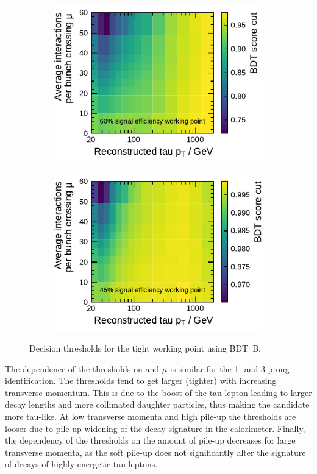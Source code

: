 \begin{figure}[htb]
  \centering
  \begin{subfigure}[t]{0.48\textwidth}
    \centering
    \includegraphics{./figures/bdt_perf/working_points/grid_1p_subsampling0269_wp.pdf}
  \end{subfigure}\hfill
  \begin{subfigure}[t]{0.48\textwidth}
    \centering
    \includegraphics{./figures/bdt_perf/working_points/grid_3p0327_wp.pdf}
  \end{subfigure}
  \caption{Decision thresholds for the tight working point using \mbox{BDT B}.}
  \label{fig:working_point_cutmap}
\end{figure}

The dependence of the thresholds on \tauhadvis \pt and $\mu$ is similar for the
1- and 3-prong identification. The thresholds tend to get larger (tighter) with
increasing transverse momentum. This is due to the boost of the tau lepton
leading to larger decay lengths and more collimated daughter particles, thus
making the \tauhadvis candidate more tau-like. At low transverse momenta and
high pile-up the thresholds are looser due to pile-up widening of the decay
signature in the calorimeter. Finally, the dependency of the thresholds on the
amount of pile-up decreases for large transverse momenta, as the soft pile-up
does not significantly alter the signature of decays of highly energetic tau
leptons.

